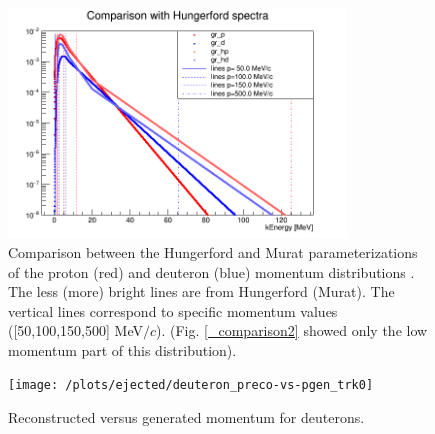 \documentclass[12pt,a4paper,openright, oneside, titlepage]{book} %
\begin{document}
\begin{figure}[h!]
\centering
\includegraphics[width =0.8\textwidth, keepaspectratio]{new_spectra_2/comparison}
\caption[Comparison of two parameterizaion on the full momentum range]
{Comparison between the Hungerford and Murat parameterizations of the proton (red)  and deuteron (blue)
momentum distributions \cite{Hungerford} \cite{Pasha:spectra}. 
The less (more) bright lines are from Hungerford (Murat). 
The vertical lines correspond to specific momentum values ([50,100,150,500] MeV$/c$).
(Fig. \ref{_comparison2} showed only the low momentum part of this distribution).}
\label{_comparison}
\end{figure}

\begin{figure}[!htb]
\centering
\texttt{[image: /plots/ejected/deuteron\_preco-vs-pgen\_trk0]}
\caption[Reconstructed vs generated momentum (ejected deuterons)]
{Reconstructed versus generated momentum for deuterons.}
\label{_deuteron_preco-vs-pgen_trk0}
\end{figure}
\end{document}
